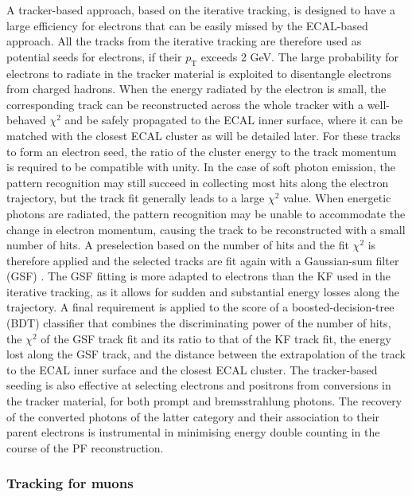A tracker-based approach, based on the iterative tracking, is designed to have a large efficiency for electrons that can be easily missed by the ECAL-based approach. All the tracks from the iterative tracking are therefore used as potential seeds for electrons, if their $p_{\mathrm{T}}$ exceeds 2 GeV. The large probability for electrons to radiate in the tracker material is exploited to disentangle electrons from charged hadrons. When the energy radiated by the electron is small, the corresponding track can be reconstructed across the whole tracker with a well-behaved $\chi^2$ and be safely propagated to the ECAL inner surface, where it can be matched with the closest ECAL cluster as will be detailed later.  For these tracks to form an electron seed, the ratio of the cluster energy to the track momentum is required to be compatible with unity. In the case of soft photon emission, the pattern recognition may still succeed in collecting most hits along the electron trajectory, but the track fit generally leads to a large $\chi^2$ value.  When energetic photons are radiated, the pattern recognition may be unable to accommodate the change in electron momentum, causing the track to be reconstructed with a small number of hits. A preselection based on the number of hits and the fit $\chi^2$ is therefore applied and the selected tracks are fit again with a Gaussian-sum filter (GSF) \cite{Adam_2005}. The GSF fitting is more adapted to electrons than the KF used in the iterative tracking, as it allows for sudden and substantial energy losses along the trajectory. A final requirement is applied to the score of a boosted-decision-tree (BDT) classifier that combines the discriminating power of the number of hits, the $\chi^2$ of the GSF track fit and its ratio to that of the KF track fit, the energy lost along the GSF track, and the distance between the extrapolation of the track to the ECAL inner surface and the closest ECAL cluster. The tracker-based seeding is also effective at selecting electrons and positrons from conversions in the tracker material, for both prompt and bremsstrahlung photons.  The recovery of the converted photons of the latter category and their association to their parent electrons is instrumental in minimising energy double counting in the course of the PF reconstruction.


\subsubsection{Tracking for muons}

